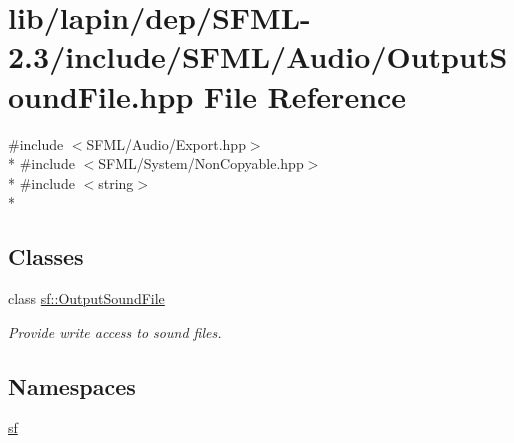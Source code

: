 \hypertarget{lapin_2dep_2_s_f_m_l-2_83_2include_2_s_f_m_l_2_audio_2_output_sound_file_8hpp}{\section{lib/lapin/dep/\-S\-F\-M\-L-\/2.3/include/\-S\-F\-M\-L/\-Audio/\-Output\-Sound\-File.hpp File Reference}
\label{lapin_2dep_2_s_f_m_l-2_83_2include_2_s_f_m_l_2_audio_2_output_sound_file_8hpp}
}
{\ttfamily \#include $<$S\-F\-M\-L/\-Audio/\-Export.\-hpp$>$}\\*
{\ttfamily \#include $<$S\-F\-M\-L/\-System/\-Non\-Copyable.\-hpp$>$}\\*
{\ttfamily \#include $<$string$>$}\\*
\subsection*{Classes}
\begin{DoxyCompactItemize}
\item 
class \hyperlink{classsf_1_1_output_sound_file}{sf\-::\-Output\-Sound\-File}
\begin{DoxyCompactList}\small\item\em Provide write access to sound files. \end{DoxyCompactList}\end{DoxyCompactItemize}
\subsection*{Namespaces}
\begin{DoxyCompactItemize}
\item 
\hyperlink{namespacesf}{sf}
\end{DoxyCompactItemize}
